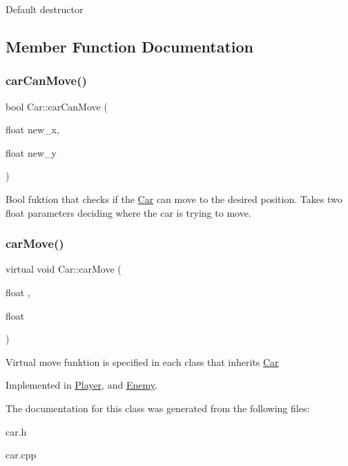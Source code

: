 Default destructor 

\subsection{Member Function Documentation}
\mbox{\label{classCar_a912e7849671d8390a9907917c0722549}} 
\subsubsection{\texorpdfstring{car\+Can\+Move()}{carCanMove()}}
{\footnotesize\ttfamily bool Car\+::car\+Can\+Move (\begin{DoxyParamCaption}\item[{float}]{new\+\_\+x,  }\item[{float}]{new\+\_\+y }\end{DoxyParamCaption})\hspace{0.3cm}{\ttfamily [protected]}}

Bool fuktion that checks if the \hyperlink{classCar}{Car} can move to the desired position. Takes two float parameters deciding where the car is trying to move. \mbox{\label{classCar_a9650df764ceee00f738b888a7a976996}} 
\subsubsection{\texorpdfstring{car\+Move()}{carMove()}}
{\footnotesize\ttfamily virtual void Car\+::car\+Move (\begin{DoxyParamCaption}\item[{float}]{,  }\item[{float}]{ }\end{DoxyParamCaption})\hspace{0.3cm}{\ttfamily [pure virtual]}}

Virtual move funktion is specified in each class that inherits \hyperlink{classCar}{Car} 

Implemented in \hyperlink{classPlayer_a962661bbdff64b195582edbd0dcb3e1e}{Player}, and \hyperlink{classEnemy_a8b36ae5a6d6fd18d0064139ce92e7661}{Enemy}.



The documentation for this class was generated from the following files\+:\begin{DoxyCompactItemize}
\item 
car.\+h\item 
car.\+cpp\end{DoxyCompactItemize}
